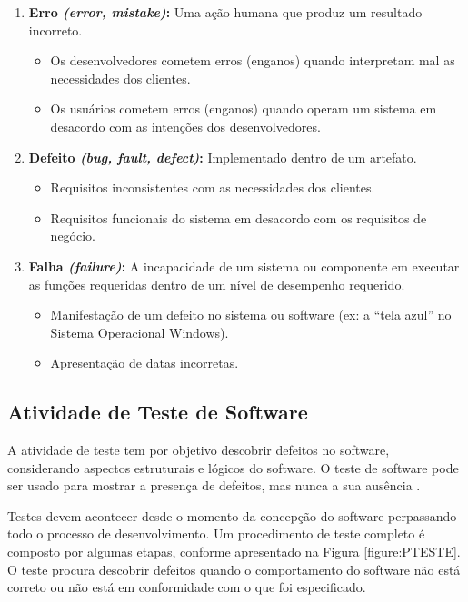 \begin{enumerate}
    \item \textbf{Erro \textit{(error, mistake)}:} Uma ação humana que produz um resultado incorreto.
    
    \begin{itemize}
        \item Os desenvolvedores cometem erros (enganos) quando interpretam mal as necessidades dos clientes.
        \item Os usuários cometem erros (enganos) quando operam um sistema em desacordo com as intenções dos desenvolvedores.
    \end{itemize}
    
    \item \textbf{Defeito \textit{(bug, fault, defect)}:} Implementado dentro de um artefato.
    
    \begin{itemize}
        \item Requisitos inconsistentes com as necessidades dos clientes.
        \item Requisitos funcionais do sistema em desacordo com os requisitos de
negócio.
    \end{itemize}
    
     \item \textbf{Falha \textit{(failure)}:} A incapacidade de um sistema ou componente em executar
as funções requeridas dentro de um nível de desempenho requerido.

    \begin{itemize}
        \item Manifestação de um defeito no sistema ou software (ex: a ``tela azul'' no Sistema Operacional Windows).
        \item Apresentação de datas incorretas.
    \end{itemize}
    
\end{enumerate}

\subsection{Atividade de Teste de Software}

A atividade de teste tem por objetivo descobrir defeitos no software, considerando aspectos estruturais e lógicos do software. O teste de software pode ser usado para mostrar a presença de defeitos, mas nunca a sua ausência \cite{HIRAMA2011}.

Testes devem acontecer desde o momento da concepção do software perpassando todo o processo de desenvolvimento. Um procedimento de teste completo é composto por algumas etapas, conforme apresentado na Figura \ref{figure:PTESTE}. O teste procura descobrir defeitos quando o comportamento do software não está correto ou não está em conformidade com o que foi especificado.

